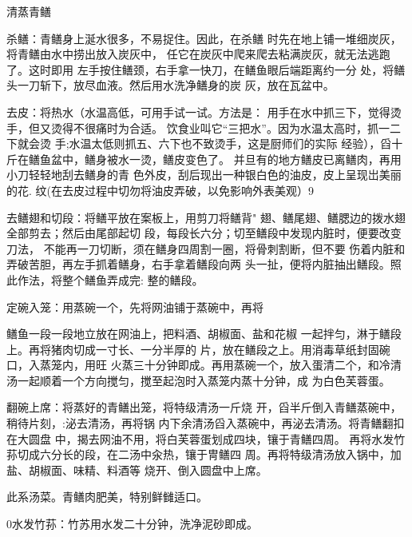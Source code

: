 \begin{recipe}{清蒸青鳝}

\ingredients



\cooking

\step 	杀鳝：青鳝身上涎水很多，不易捉住。因此，在杀鳝 时先在地上铺一堆细炭灰，将青鳝由水中捞出放入炭灰中， 任它在炭灰中爬来爬去粘满炭灰，就无法逃跑了。这时即用 左手按住鳝颈，右手拿一快刀，在鳝鱼眼后端距离约一分 处，将鳝头一刀斩下，放尽血液。然后用水洗净鳝身的炭 灰，放在瓦盆中。

\step 	去皮：将热水（水温高低，可用手试一试。方法是： 用手在水中抓三下，觉得烫手，但又烫得不很痛时为合适。 饮食业叫它“三把水”。因为水温太高时，抓一二下就会烫 手;水温太低则抓五、六下也不致烫手，这是厨师们的实际 经验），舀十斤在鳝鱼盆中，鳝身被水一烫，鳝皮变色了。 并旦有的地方鳝皮已离鳝肉，再用小刀轻轻地刮去鳝身的青 色外皮，刮后现出一种银白色的油皮，皮上呈现岀美丽的花. 纹(在去皮过程中切勿将油皮弄破，以免影响外表美观）9

\step 	去鳝翅和切段：将鳝平放在案板上，用剪刀将鳝背" 翅、鳝尾翅、鳝腮边的拨水翅全部剪去；然后由尾部起切 段，每段长六分；切至鳝段中发现内脏时，便要改变刀法， 不能再一刀切断，须在鳝身四周割一圈，将骨刺割断，但不要 伤着内脏和弄破苦胆，再左手抓着鳝身，右手拿着鳝段向两 头一扯，便将内脏抽出鳝段。照此作法，将整个鳝鱼弄成完: 整的鳝段。

\step 定碗入笼：用蒸碗一个，先将网油铺于蒸碗中，再将

鳝鱼一段一段地立放在网油上，把料酒、胡椒面、盐和花椒 一起拌匀，淋于鳝段上。再将猪肉切成一寸长、一分半厚的 片，放在鳝段之上。用消毒草纸封固碗口，入蒸笼内，用旺 火蒸三十分钟即成。再用蒸碗一个，放入蛋清二个，和冷清 汤一起顺着一个方向搅匀，搅至起泡时入蒸笼内蒸十分钟，成 为白色芙蓉蛋。

\step 翻碗上席：将蒸好的青鳝出笼，将特级清汤一斤烧 开，舀半斤倒入青鳝蒸碗中，稍待片刻，:泌去清汤，再将锅 内下余清汤舀入蒸碗中，再泌去清汤。将青鳝翻扣在大圆盘 中，揭去网油不用，将白芙蓉蛋划成四块，镶于青鳝四周。 再将水发竹荪切成六分长的段，在二汤中汆热，镶于冑鳝四 周。再将特级清汤放入锅中，加盐、胡椒面、味精、料酒等 烧开、倒入圆盘中上席。

\notes

此系汤菜。青鳝肉肥美，特别鲜雠适口。

0水发竹荪：竹苏用水发二十分钟，洗净泥砂即成。

\end{recipe}


